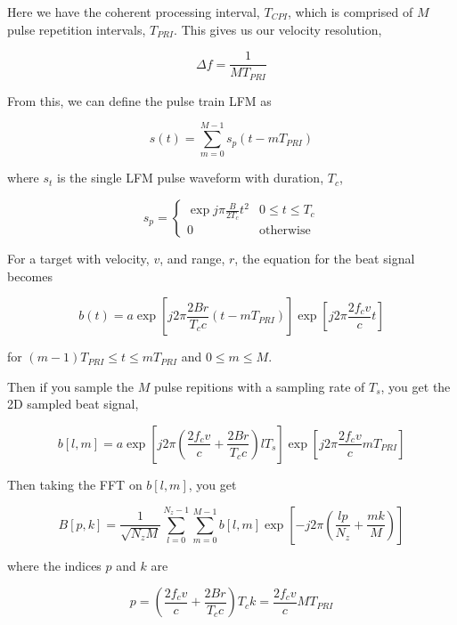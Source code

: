 \documentclass[preview]{standalone}
\begin{document}
\begin{center}
Here we have the coherent processing interval, $T_{CPI}$, which is comprised of $M$ pulse repetition intervals, $T_{PRI}$. This gives us our velocity resolution, 

\begin{equation}
    \Delta f = \frac{1}{M T_{PRI}}
\end{equation}

From this, we can define the pulse train LFM as

\begin{equation}
    s(t) = \sum_{m=0}^{M-1} s_p(t - m T_{PRI})
\end{equation}

where $s_t$ is the single LFM pulse waveform with duration, $T_c$,

\begin{equation}
    s_p = \begin{cases} 
      \exp{j \pi \frac{B}{2 T_c} t^2} & 0 \le t \le T_c \\
      0 & \text{otherwise}
   \end{cases}
\end{equation}

For a target with velocity, $v$, and range, $r$, the equation for the beat signal becomes

\begin{equation}
    b(t) = a \exp{\left[ j 2 \pi \frac{2 B r}{T_c c} (t - m T_{PRI}) \right]} \exp{\left[ j 2 \pi \frac{2 f_c v}{c} t \right]}
\end{equation}

for $(m-1) T_{PRI} \le t \le m T_{PRI}$ and $0 \le m \le M$.

Then if you sample the $M$ pulse repitions with a sampling rate of $T_s$, you get the 2D sampled beat signal,

\begin{equation}
    b[l, m] = a \exp{\left[ j 2 \pi \left( \frac{2 f_c v}{c} + \frac{2 B r}{T_c c} \right) l T_s \right]} \exp{\left[ j 2 \pi \frac{2 f_c v}{c} m T_{PRI} \right]}
\end{equation}

Then taking the FFT on $b[l, m]$, you get

\begin{equation}
    B[p, k] = \frac{1}{\sqrt{N_z M}} \sum_{l=0}^{N_z-1} \sum_{m=0}^{M-1} b[l, m] \exp{\left[ -j 2 \pi \left( \frac{lp}{N_z} + \frac{mk}{M} \right) \right]}
\end{equation}

where the indices $p$ and $k$ are

\begin{equation}
    p = \left( \frac{2 f_c v}{c} + \frac{2 B r}{T_c c} \right) T_c 
    k = \frac{2 f_c v}{c} M T_{PRI}
\end{equation}
\end{center}
\end{document}
